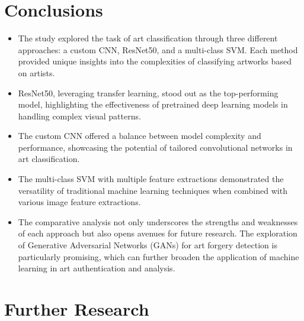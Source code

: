 \documentclass[a0,portrait]{a0poster}
\begin{document}
\begin{multicols}{2}

\color{SaddleBrown} %

\section*{Conclusions}

\begin{itemize}
\item The study explored the task of art classification through three different approaches: a custom CNN, ResNet50, and a multi-class SVM. Each method provided unique insights into the complexities of classifying artworks based on artists.
\item ResNet50, leveraging transfer learning, stood out as the top-performing model, highlighting the effectiveness of pretrained deep learning models in handling complex visual patterns.
\item The custom CNN offered a balance between model complexity and performance, showcasing the potential of tailored convolutional networks in art classification.
\item The multi-class SVM with multiple feature extractions demonstrated the versatility of traditional machine learning techniques when combined with various image feature extractions.
\item The comparative analysis not only underscores the strengths and weaknesses of each approach but also opens avenues for future research. The exploration of Generative Adversarial Networks (GANs) for art forgery detection is particularly promising, which can further broaden the application of machine learning in art authentication and analysis.
\end{itemize}


\color{DarkSlateGray} %


\section*{Further Research}


\end{multicols}
\end{document}
